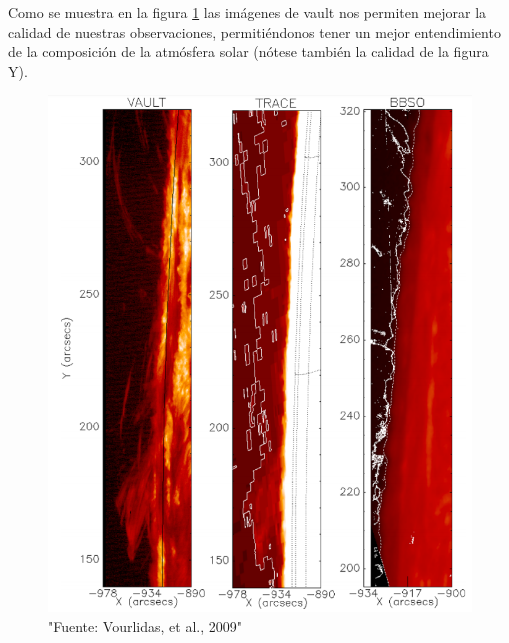 \documentclass[9pt]{book}
\begin{document}
Como se muestra en la figura \ref{fig:vault_compare} las im\'agenes de vault nos permiten mejorar la calidad de nuestras observaciones, permiti\'endonos tener un mejor entendimiento de la composici\'on de la atm\'osfera solar (n\'otese tambi\'en la calidad de la figura Y).

\begin{figure}[h]
\centering
\includegraphics[scale=0.6]{vault_comparison}
\caption{"Fuente: Vourlidas, et al., 2009"}
\label{fig:vault_compare}
\end{figure}
\end{document}
